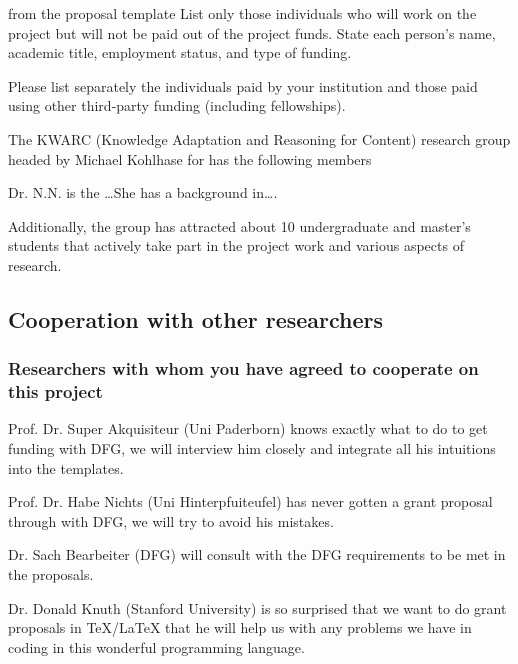 \begin{todo}{from the proposal template}
List only those individuals who will work on the project but will not be paid out of the
project funds. State each person’s name, academic title, employment status, and type
of funding.

Please list separately the individuals paid by your institution and those paid using other
third-party funding (including fellowships).
\end{todo}
The KWARC (Knowledge Adaptation and Reasoning for Content) research group headed by
Michael Kohlhase for has the following members
\begin{compactdesc}
\item[Dr. N.N.] is the \ldots She has a background in\ldots.
\end{compactdesc}
Additionally, the group has attracted about 10 undergraduate and master's students that
actively take part in the project work and various aspects of research.


\subsection{Cooperation with other researchers }

\subsubsection{Researchers with whom you have agreed to cooperate on this project }

\begin{compactdesc}
\item[Prof. Dr. Super Akquisiteur (Uni Paderborn)] knows exactly what to do to get funding
  with DFG, we will interview him closely and integrate all his intuitions into the
  {\pn} templates.
\item[Prof. Dr. Habe Nichts (Uni Hinterpfuiteufel)] has never gotten a grant proposal
  through with DFG, we will try to avoid his mistakes.
\item[Dr. Sach Bearbeiter (DFG)] will consult with the DFG requirements to be met in the
  proposals.
\item[Dr. Donald Knuth (Stanford University)] is so surprised that we want to do grant
  proposals in {\TeX/\LaTeX} that he will help us with any problems we have in coding in
  this wonderful programming language.
\end{compactdesc}

